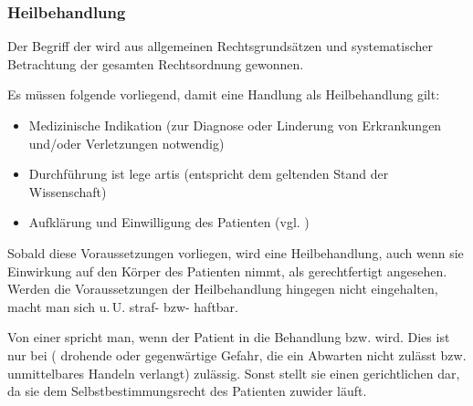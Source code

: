 \subsubsection{Heilbehandlung}
\label{topic:heilbehandlung}

Der Begriff der  wird aus allgemeinen
Rechtsgrundsätzen und systematischer Betrachtung der
gesamten Rechtsordnung gewonnen.

Es müssen folgende  vorliegend, damit
eine Handlung als Heilbehandlung gilt:
\begin{itemize}
    \item Medizinische Indikation (zur
    Diagnose oder Linderung von Erkrankungen und/oder
    Verletzungen notwendig)
    \item Durchführung ist lege artis (entspricht dem
    geltenden Stand der Wissenschaft)
    \item Aufklärung und Einwilligung des Patienten (vgl.
    )
\end{itemize}

Sobald diese Voraussetzungen vorliegen, wird eine
Heilbehandlung, auch wenn sie Einwirkung auf den Körper
des Patienten nimmt, als gerechtfertigt angesehen. 
Werden die Voraussetzungen der Heilbehandlung hingegen nicht
eingehalten, macht man sich u.\,U. straf- bzw-
haftbar.

{\label{topic:eigenmächtige-heilbehandlung}
Von einer  spricht man,
wenn der Patient in die Behandlung  bzw.
 wird. Dies ist nur bei  ( drohende oder
gegenwärtige Gefahr, die ein Abwarten nicht zulässt bzw.
unmittelbares Handeln verlangt) zulässig. Sonst stellt
sie einen gerichtlichen 
dar, da sie dem
Selbstbestimmungsrecht des Patienten zuwider läuft.


} {}{}{}{}


